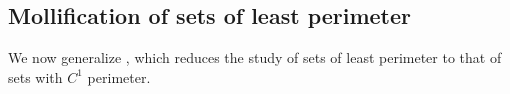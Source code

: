 \documentclass[reqno,12pt,letterpaper]{amsart}
\newcommand*\dif{\mathop{}\!\mathrm{d}}
\newtheorem{sublemma}[theorem]{Sublemma}
\theoremstyle{definition}
\numberwithin{equation}{section}
\begin{document}


\subsection{Mollification of sets of least perimeter}
We now generalize \cite[Lemma 7.5]{Giusti77}, which reduces the study of sets of least perimeter to that of sets with $C^1$ perimeter.
\end{document}
